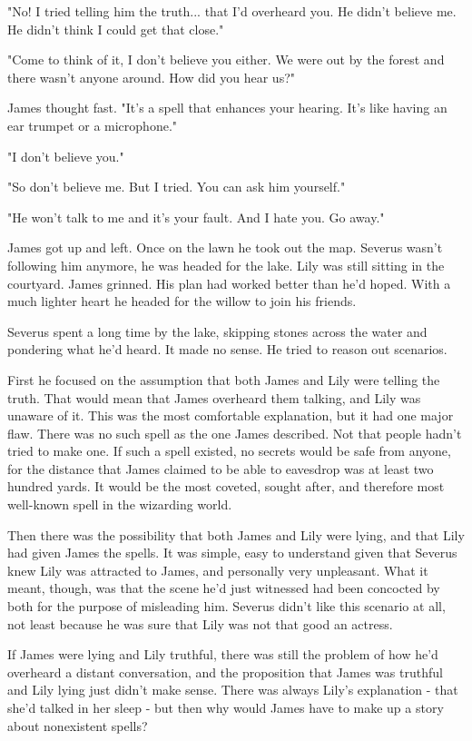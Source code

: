 \documentclass[a4paper,11pt]{article}
\begin{document}
"No! I tried telling him the truth... that I'd overheard you. He didn't believe me. He didn't think I could get that close."

"Come to think of it, I don't believe you either. We were out by the forest and there wasn't anyone around. How did you hear us?"

James thought fast. "It's a spell that enhances your hearing. It's like having an ear trumpet or a microphone."

"I don't believe you."

"So don't believe me. But I tried. You can ask him yourself."

"He won't talk to me and it's your fault. And I hate you. Go away."

James got up and left. Once on the lawn he took out the map. Severus wasn't following him anymore, he was headed for the lake. Lily was still sitting in the courtyard. James grinned. His plan had worked better than he'd hoped. With a much lighter heart he headed for the willow to join his friends.

Severus spent a long time by the lake, skipping stones across the water and pondering what he'd heard. It made no sense. He tried to reason out scenarios.

First he focused on the assumption that both James and Lily were telling the truth. That would mean that James overheard them talking, and Lily was unaware of it. This was the most comfortable explanation, but it had one major flaw. There was no such spell as the one James described. Not that people hadn't tried to make one. If such a spell existed, no secrets would be safe from anyone, for the distance that James claimed to be able to eavesdrop was at least two hundred yards. It would be the most coveted, sought after, and therefore most well-known spell in the wizarding world.

Then there was the possibility that both James and Lily were lying, and that Lily had given James the spells. It was simple, easy to understand given that Severus knew Lily was attracted to James, and personally very unpleasant. What it meant, though, was that the scene he'd just witnessed had been concocted by both for the purpose of misleading him. Severus didn't like this scenario at all, not least because he was sure that Lily was not that good an actress.

If James were lying and Lily truthful, there was still the problem of how he'd overheard a distant conversation, and the proposition that James was truthful and Lily lying just didn't make sense. There was always Lily's explanation - that she'd talked in her sleep - but then why would James have to make up a story about nonexistent spells?
\end{document}
